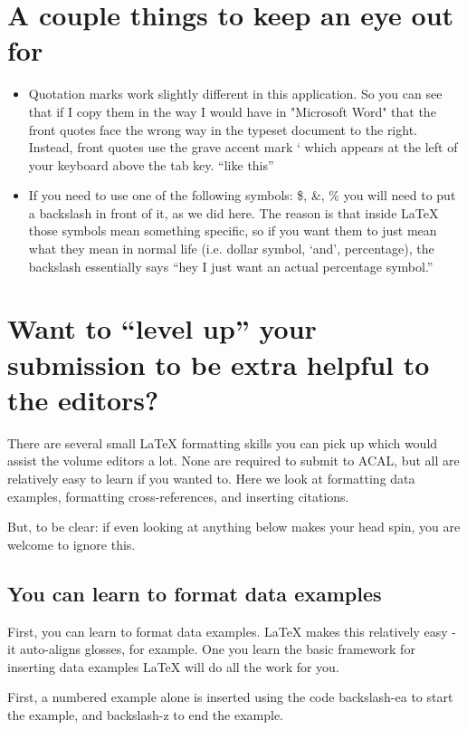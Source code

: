 \documentclass[output=paper,colorlinks,citecolor=brown,
]{langscibook}
\begin{document}
\section{A couple things to keep an eye out for}

\begin{itemize}
\item Quotation marks work slightly different in this application. So you can see that if I copy them in the way I would have in "Microsoft Word" that the front quotes face the wrong way in the typeset document to the right. Instead, front quotes use the grave accent mark ` which appears at the left of your keyboard above the tab key. ``like this''
\item If you need to use one of the following symbols:  \$, \&, \%  you will need to put a backslash in front of it, as we did here. The reason is that inside LaTeX those symbols mean something specific, so if you want them to just mean what they mean in normal life (i.e. dollar symbol, `and', percentage), the backslash essentially says ``hey I just want an actual percentage symbol.”  
\end{itemize}


\section{Want to ``level up'' your submission to be extra helpful to the editors?}

There are several small LaTeX formatting skills you can pick up which would assist the volume editors a lot. None are required to submit to ACAL, but all are relatively easy to learn if you wanted to. Here we look at formatting data examples, formatting cross-references, and inserting citations.

But, to be clear: if even looking at anything below makes your head spin, you are welcome to ignore this. 

\subsection{You can learn to format data examples}

First, you can learn to format data examples. LaTeX makes this relatively easy - it auto-aligns glosses, for example. One you learn the basic framework for inserting data examples LaTeX will do all the work for you. 

First, a numbered example alone is inserted using the code backslash-ea to start the example, and backslash-z to end the example.
\end{document}
